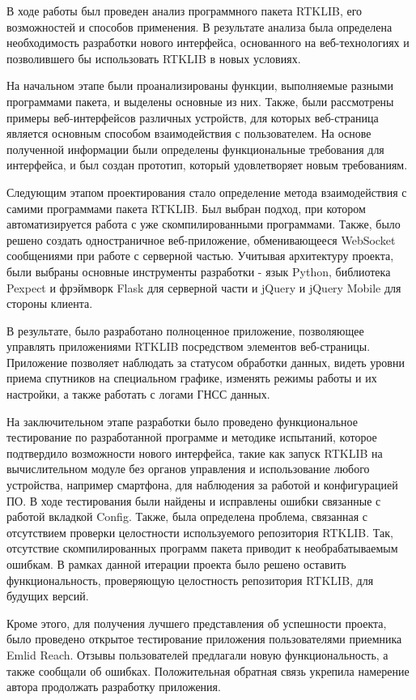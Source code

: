 \conclusion

В ходе работы был проведен анализ программного пакета RTKLIB, его возможностей и способов применения. В результате анализа была определена необходимость разработки нового интерфейса, основанного на веб-технологиях и позволившего бы использовать RTKLIB в новых условиях.

На начальном этапе были проанализированы функции, выполняемые разными программами пакета, и выделены основные из них. Также, были рассмотрены примеры веб-интерфейсов различных устройств, для которых веб-страница является основным способом взаимодействия с пользователем. На основе полученной информации были определены функциональные требования для интерфейса, и был создан прототип, который удовлетворяет новым требованиям.

Следующим этапом проектирования стало определение метода взаимодействия с самими программами пакета RTKLIB. Был выбран подход, при котором автоматизируется работа с уже скомпилированными программами. Также, было решено создать одностраничное веб-приложение, обменивающееся WebSocket сообщениями при работе с серверной частью. Учитывая архитектуру проекта, были выбраны основные инструменты разработки - язык Python, библиотека Pexpect и фрэймворк Flask для серверной части и jQuery и jQuery Mobile для стороны клиента.

В результате, было разработано полноценное приложение, позволяющее управлять приложениями RTKLIB посредством элементов веб-страницы. Приложение позволяет наблюдать за статусом обработки данных, видеть уровни приема спутников на специальном графике, изменять режимы работы и их настройки, а также работать с логами ГНСС данных.

На заключительном этапе разработки было проведено функциональное тестирование по разработанной программе и методике испытаний, которое подтвердило возможности нового интерфейса, такие как запуск RTKLIB на вычислительном модуле без органов управления и использование любого устройства, например смартфона, для наблюдения за работой и конфигурацией ПО. В ходе тестирования были найдены и исправлены ошибки связанные с работой вкладкой Config. Также, была определена проблема, связанная с отсутствием проверки целостности используемого репозитория RTKLIB. Так, отсутствие скомпилированных программ пакета приводит к необрабатываемым ошибкам. В рамках данной итерации проекта было решено оставить функциональность, проверяющую целостность репозитория RTKLIB, для будущих версий.

Кроме этого, для получения лучшего представления об успешности проекта, было проведено открытое тестирование приложения пользователями приемника Emlid Reach. Отзывы пользователей предлагали новую функциональность, а также сообщали об ошибках. Положительная обратная связь укрепила намерение автора продолжать разработку приложения.

